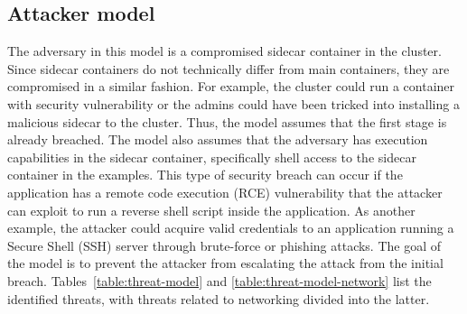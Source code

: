 \documentclass[english, 12pt, a4paper, sci, utf8, a-2b, online]{aaltothesis}
\begin{document}
\subsection{Attacker model}

The adversary in this model is a compromised sidecar container in the cluster.
Since sidecar containers do not technically differ from main containers, they are compromised in a similar fashion.
For example, the cluster could run a container with security vulnerability or the admins could have been tricked into installing a malicious sidecar to the cluster.
Thus, the model assumes that the first stage is already breached.
The model also assumes that the adversary has execution capabilities in the sidecar container, specifically shell access to the sidecar container in the examples.
This type of security breach can occur if the application has a remote code execution (RCE) vulnerability that the attacker can exploit to run a reverse shell script inside the application.
As another example, the attacker could acquire valid credentials to an application running a Secure Shell (SSH) server through brute-force or phishing attacks.
The goal of the model is to prevent the attacker from escalating the attack from the initial breach.
Tables~\ref{table:threat-model} and \ref{table:threat-model-network} list the identified threats, with threats related to networking divided into the latter.
\end{document}
